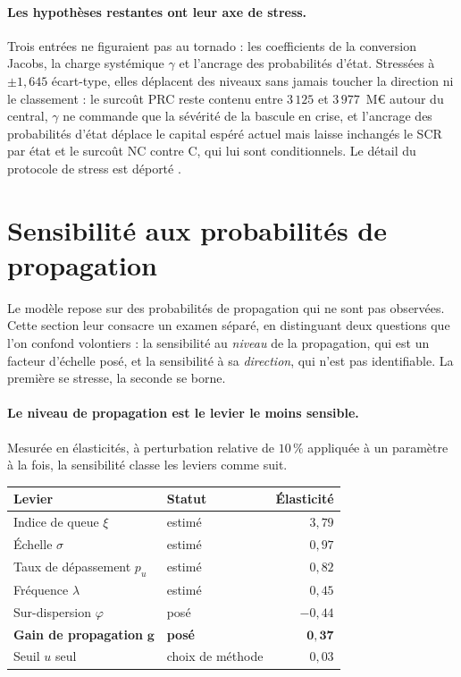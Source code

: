 \paragraph{Les hypothèses restantes ont leur axe de stress.} Trois entrées ne figuraient pas au
tornado : les coefficients de la conversion Jacobs, la charge systémique $\gamma$ et l'ancrage
des probabilités d'état. Stressées à $\pm 1{,}645$ écart-type, elles déplacent des niveaux sans
jamais toucher la direction ni le classement : le surcoût PRC reste contenu entre $3\,125$ et
$3\,977$~M\euro{} autour du central, $\gamma$ ne commande que la sévérité de la bascule en
crise, et l'ancrage des probabilités d'état déplace le capital espéré actuel mais laisse
inchangés le SCR par état et le surcoût NC contre C, qui lui sont conditionnels. Le détail du
protocole de stress est déporté \matcomp.

\section{Sensibilité aux probabilités de propagation}


Le modèle repose sur des probabilités de propagation qui ne sont pas observées. Cette section
leur consacre un examen séparé, en
distinguant deux questions que l'on confond volontiers : la sensibilité au \emph{niveau} de la
propagation, qui est un facteur d'échelle posé, et la sensibilité à sa \emph{direction}, qui
n'est pas identifiable. La première se stresse, la seconde se borne.

\paragraph{Le niveau de propagation est le levier le moins sensible.} Mesurée en élasticités, à
perturbation relative de $10\,\%$ appliquée à un paramètre à la fois, la sensibilité classe les
leviers comme suit.

\begin{center}\footnotesize
\renewcommand{\arraystretch}{1.15}
\begin{tabular}{@{}l l r@{}}
\toprule
\textbf{Levier} & \textbf{Statut} & \textbf{Élasticité} \\
\midrule
Indice de queue $\xi$ & estimé & $3{,}79$ \\
Échelle $\sigma$ & estimé & $0{,}97$ \\
Taux de dépassement $p_u$ & estimé & $0{,}82$ \\
Fréquence $\lambda$ & estimé & $0{,}45$ \\
Sur-dispersion $\varphi$ & posé & $-0{,}44$ \\
\textbf{Gain de propagation} $\boldsymbol{g}$ & \textbf{posé} & $\mathbf{0{,}37}$ \\
Seuil $u$ seul & choix de méthode & $0{,}03$ \\
\bottomrule
\end{tabular}
\end{center}

